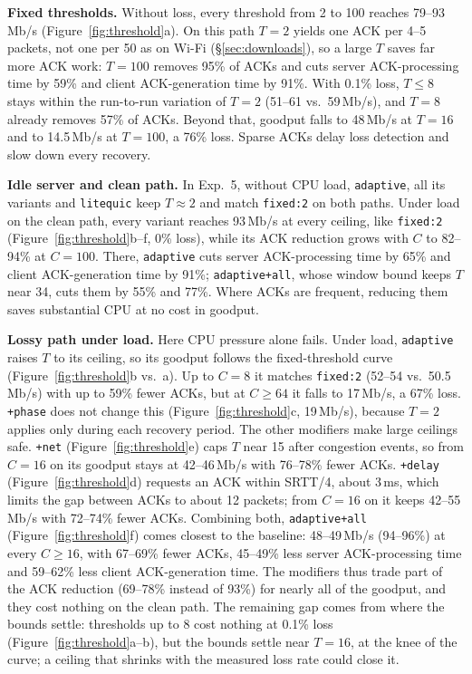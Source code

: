\documentclass[11pt]{article}
\newcommand{\pol}[1]{\texttt{#1}}            %
\newcommand{\para}[1]{\textbf{#1}} %
\newcommand{\ms}{\,ms}
\newcommand{\mbps}{\,Mb/s}
\begin{document}
\para{Fixed thresholds.} Without loss, every threshold from 2 to 100 reaches 79--93\mbps{}
(Figure~\ref{fig:threshold}a). On this path $T{=}2$ yields one ACK per 4--5 packets, not one per
50 as on Wi-Fi (\S\ref{sec:downloads}), so a large $T$ saves far more ACK work: $T{=}100$ removes
95\% of ACKs and cuts server ACK-processing time by 59\% and client ACK-generation time by 91\%.
With 0.1\% loss, $T{\le}8$ stays within the run-to-run variation of $T{=}2$ (51--61 vs.\
59\mbps), and $T{=}8$ already removes 57\% of ACKs. Beyond that, goodput falls to 48\mbps{} at
$T{=}16$ and to 14.5\mbps{} at $T{=}100$, a 76\% loss. Sparse ACKs delay loss detection and slow down every recovery.

\para{Idle server and clean path.} In Exp.~5, without CPU load, \pol{adaptive}, all its variants
and \pol{litequic} keep $T{\approx}2$ and match \pol{fixed:2} on both paths. Under load on the clean
path, every variant reaches 93\mbps{} at every ceiling, like \pol{fixed:2}
(Figure~\ref{fig:threshold}b--f, 0\% loss), while its ACK reduction grows with $C$ to 82--94\% at
$C{=}100$. There, \pol{adaptive} cuts server ACK-processing time by 65\% and client ACK-generation
time by 91\%; \pol{adaptive+all}, whose window bound keeps $T$ near 34, cuts them by 55\% and
77\%. Where ACKs are frequent, reducing them saves substantial CPU at no cost in goodput.

\para{Lossy path under load.} Here CPU pressure alone fails. Under load, \pol{adaptive} raises
$T$ to its ceiling, so its goodput follows the fixed-threshold curve
(Figure~\ref{fig:threshold}b vs.\ a). Up to $C{=}8$ it matches \pol{fixed:2} (52--54 vs.\
50.5\mbps) with up to 59\% fewer ACKs, but at $C{\ge}64$ it falls to 17\mbps, a 67\% loss.
\pol{+phase} does not change this (Figure~\ref{fig:threshold}c, 19\mbps), because $T{=}2$ applies
only during each recovery period. The other modifiers make large ceilings safe. \pol{+net}
(Figure~\ref{fig:threshold}e) caps $T$ near 15 after congestion events, so from $C{=}16$ on its
goodput stays at 42--46\mbps{} with 76--78\% fewer ACKs. \pol{+delay} (Figure~\ref{fig:threshold}d)
requests an ACK within SRTT/4, about 3\ms, which limits the gap between ACKs to about 12 packets;
from $C{=}16$ on it keeps 42--55\mbps{} with 72--74\% fewer ACKs. Combining both,
\pol{adaptive+all} (Figure~\ref{fig:threshold}f) comes closest to the baseline: 48--49\mbps{}
(94--96\%) at every $C{\ge}16$, with 67--69\% fewer ACKs, 45--49\% less server ACK-processing time
and 59--62\% less client ACK-generation time. The modifiers thus trade part of the ACK reduction
(69--78\% instead of 93\%) for nearly all of the goodput, and they cost nothing on the clean path.
The remaining gap comes from where the bounds settle: thresholds up to 8 cost nothing at 0.1\%
loss (Figure~\ref{fig:threshold}a--b), but the bounds settle near $T{=}16$, at the knee of the
curve; a ceiling that shrinks with the measured loss rate could close it.
\end{document}
